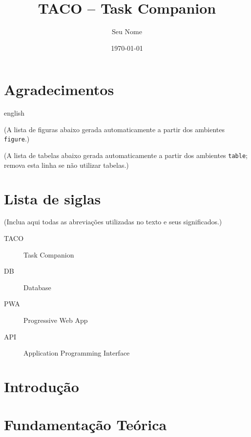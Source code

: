 \documentclass[12pt,openright,twoside,a4paper]{abntex2}
\title{TACO -- Task Companion}
\author{Seu Nome}
\date{\today}
\begin{document}
\imprimircapa

\imprimirfolhaderosto

\begin{folhadeaprovacao}
\end{folhadeaprovacao}

\chapter*{Agradecimentos}
\lipsum[1]

\begin{resumo}

\end{resumo}

\begin{otherlanguage*}{english}
\begin{abstract}

\end{abstract}
\end{otherlanguage*}

(A lista de figuras abaixo \e gerada automaticamente a partir dos ambientes \texttt{figure}.)
\listoffigures
(A lista de tabelas abaixo \e gerada automaticamente a partir dos ambientes \texttt{table}; remova esta linha se n\~ao utilizar tabelas.)
\listoftables
\chapter*{Lista de siglas}
(Inclua aqui todas as abrevia\c{c}\~oes utilizadas no texto e seus significados.)
\begin{description}
  \item[TACO] Task Companion
  \item[DB] Database
  \item[PWA] Progressive Web App
  \item[API] Application Programming Interface
\end{description}

\tableofcontents

\chapter{Introdução}
\lipsum[2]

\chapter{Fundamentação Teórica}
\lipsum[3]
\end{document}
